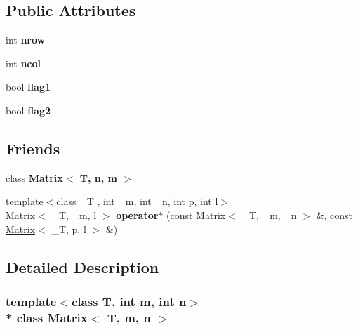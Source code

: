 \subsection*{Public Attributes}
\begin{DoxyCompactItemize}
\item 
int {\bfseries nrow}\hypertarget{classMatrix_abf937e657da2a3a625f704fd1568a9b0}{}\label{classMatrix_abf937e657da2a3a625f704fd1568a9b0}

\item 
int {\bfseries ncol}\hypertarget{classMatrix_a487a37e9cff00849712b7f7518fcd669}{}\label{classMatrix_a487a37e9cff00849712b7f7518fcd669}

\item 
bool {\bfseries flag1}\hypertarget{classMatrix_a5f7fde3d29abf2546c0a493492aa493d}{}\label{classMatrix_a5f7fde3d29abf2546c0a493492aa493d}

\item 
bool {\bfseries flag2}\hypertarget{classMatrix_a7980c98c92fa7235fa622714281deda7}{}\label{classMatrix_a7980c98c92fa7235fa622714281deda7}

\end{DoxyCompactItemize}
\subsection*{Friends}
\begin{DoxyCompactItemize}
\item 
class {\bfseries Matrix$<$ T, n, m $>$}\hypertarget{classMatrix_af605af7f7385a53d54fa71f056de3ae8}{}\label{classMatrix_af605af7f7385a53d54fa71f056de3ae8}

\item 
{\footnotesize template$<$class \+\_\+T , int \+\_\+m, int \+\_\+n, int p, int l$>$ }\\\hyperlink{classMatrix}{Matrix}$<$ \+\_\+T, \+\_\+m, l $>$ {\bfseries operator$\ast$} (const \hyperlink{classMatrix}{Matrix}$<$ \+\_\+T, \+\_\+m, \+\_\+n $>$ \&, const \hyperlink{classMatrix}{Matrix}$<$ \+\_\+T, p, l $>$ \&)\hypertarget{classMatrix_a88d24ca802ed274a2a5a9c7fd176017e}{}\label{classMatrix_a88d24ca802ed274a2a5a9c7fd176017e}

\end{DoxyCompactItemize}


\subsection{Detailed Description}
\subsubsection*{template$<$class T, int m, int n$>$\\*
class Matrix$<$ T, m, n $>$}

